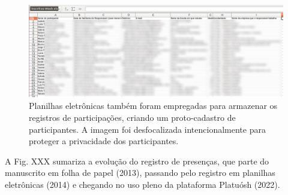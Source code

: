 \documentclass[
12pt,		%
openright,	%
twoside,  %
a4paper,			%
chapter=TITLE,		%
english,			%
french,				%
spanish,			%
brazil				%
]{USPSC-classe/USPSC}
\begin{document}
\begin{figure}[max size={\textwidth}{\textheight}]
\begin{minipage}[b]{0.4\linewidth}
                \label{9a8c04c719fc4f9811165547ded35a00eb4fbeed}
\end{minipage}
\hspace{0.5cm}
\begin{minipage}[b]{0.4\linewidth}
        \centering
                \includegraphics[width=1.0\linewidth]{../../imagens/blurred-planilha2.png}
                \caption{Planilhas eletr\^onicas tamb\'em foram empregadas para armazenar os registros de participa\c{c}\~oes, criando um proto-cadastro de participantes. A imagem foi desfocalizada intencionalmente para proteger a privacidade dos participantes.}
                \label{b43907f0fa6b6fb935e7384ab03b508859ff0609}
\end{minipage}%
\hspace{0.5cm}
\end{figure}



A Fig. XXX sumariza a evolu\c{c}\~ao do registro de presen\c{c}as, que parte do manuscrito em folha de papel (2013), passando pelo registro em planilhas eletr\^onicas (2014) e chegando no uso pleno da plataforma Platu\'osh (2022).
\end{document}
